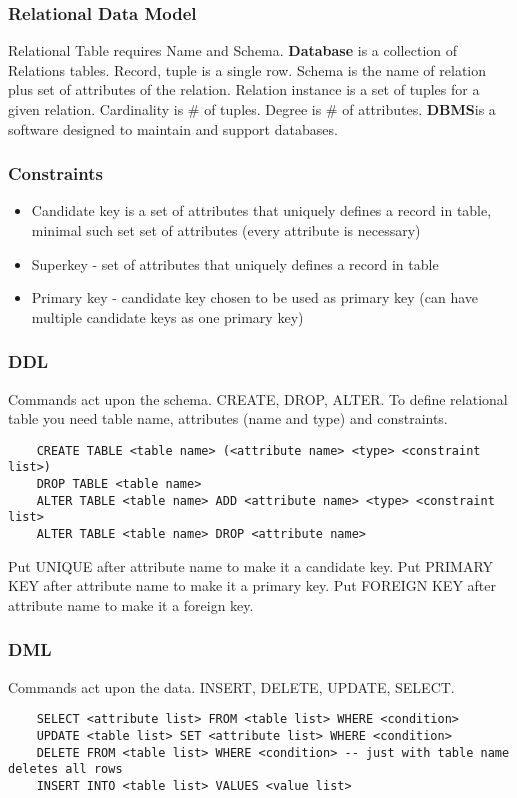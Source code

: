 \documentclass{article}
\begin{document}
\subsubsection*{Relational Data Model}
Relational Table requires Name and Schema. \textbf{Database} is a collection of 
Relations tables. Record, tuple is a single row. Schema is the name of relation 
plus set of attributes of the relation. Relation instance is a set of tuples for
a given relation. Cardinality is \# of tuples. Degree is \# of attributes.
\textbf{DBMS}is a software designed to maintain and support databases.


\subsubsection*{Constraints}
\begin{itemize}
    \item Candidate key is a set of attributes that uniquely defines a record in
    table, minimal such set set of attributes (every attribute is necessary)
    \item Superkey - set of attributes that uniquely defines a record in table
    \item Primary key - candidate key chosen to be used as primary key (can have
    multiple candidate keys as one primary key)
\end{itemize}

\subsubsection*{DDL}
Commands act upon the schema. CREATE, DROP, ALTER. To define relational table
you need table name, attributes (name and type) and constraints.
\begin{verbatim}
    CREATE TABLE <table name> (<attribute name> <type> <constraint list>)
    DROP TABLE <table name>
    ALTER TABLE <table name> ADD <attribute name> <type> <constraint list>
    ALTER TABLE <table name> DROP <attribute name>
\end{verbatim}
Put UNIQUE after attribute name to make it a candidate key. Put PRIMARY KEY after
attribute name to make it a primary key. Put FOREIGN KEY after attribute name to
make it a foreign key.

\subsubsection*{DML}
Commands act upon the data. INSERT, DELETE, UPDATE, SELECT.
\begin{verbatim}
    SELECT <attribute list> FROM <table list> WHERE <condition>
    UPDATE <table list> SET <attribute list> WHERE <condition>
    DELETE FROM <table list> WHERE <condition> -- just with table name deletes all rows
    INSERT INTO <table list> VALUES <value list>
\end{verbatim}
\end{document}
